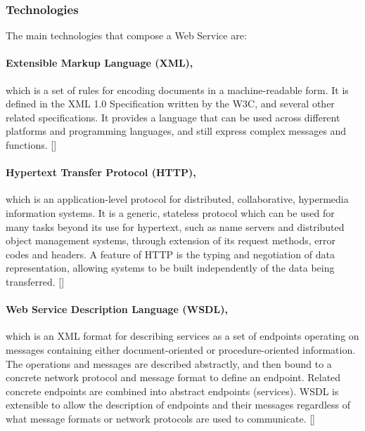 \subsubsection{Technologies}
The main technologies that compose a Web Service are:

\paragraph{Extensible Markup Language (XML),}
which is a set of rules for encoding documents in a machine-readable form. It is defined in the XML 1.0 Specification written by the W3C, and several other related specifications. It provides a language that can be used across different platforms and programming languages, and still express complex messages and functions. [\citet{XML}]

\paragraph{Hypertext Transfer Protocol (HTTP),} 
which is an application-level protocol for distributed, collaborative, hypermedia information systems. It is a generic, stateless protocol which can be used for many tasks beyond its use for hypertext, such as name servers and distributed object management systems, through extension of its request methods, error codes and headers. A feature of HTTP is the typing and negotiation of data representation, allowing systems to be built independently of the data being transferred. [\citet{HTTP}]

\paragraph{Web Service Description Language (WSDL),}
which is an XML format for describing services as a set of endpoints operating on messages containing either document-oriented or procedure-oriented information. The operations and messages are described abstractly, and then bound to a concrete network protocol and message format to define an endpoint. Related concrete endpoints are combined into abstract endpoints (services). WSDL is extensible to allow the description of endpoints and their messages regardless of what message formats or network protocols are used to communicate. [\citet{WSDL}]

